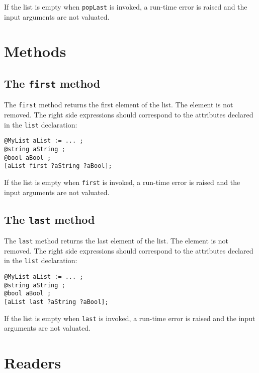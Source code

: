 If the list is empty when \lstinline[language=galgas]!popLast! is invoked, a run-time error is raised and the input arguments are not valuated.

\section{Methods}

\subsection{The \lstinline[language=galgas]!first! method}

The \lstinline[language=galgas]!first! method returns the first element of the list. The element is not removed. The right side expressions should correspond to the attributes declared in the \lstinline[language=galgas]!list! declaration:

\begin{lstlisting}[language=galgas]
@MyList aList := ... ;
@string aString ;
@bool aBool ;
[aList first ?aString ?aBool];
\end{lstlisting}

If the list is empty when \lstinline[language=galgas]!first! is invoked, a run-time error is raised and the input arguments are not valuated.

\subsection{The \lstinline[language=galgas]!last! method}

The \lstinline[language=galgas]!last! method returns the last element of the list. The element is not removed. The right side expressions should correspond to the attributes declared in the \lstinline[language=galgas]!list! declaration:\\

\begin{lstlisting}[language=galgas]
@MyList aList := ... ;
@string aString ;
@bool aBool ;
[aList last ?aString ?aBool];
\end{lstlisting}


If the list is empty when \lstinline[language=galgas]!last! is invoked, a run-time error is raised and the input arguments are not valuated.








\section{Readers}

